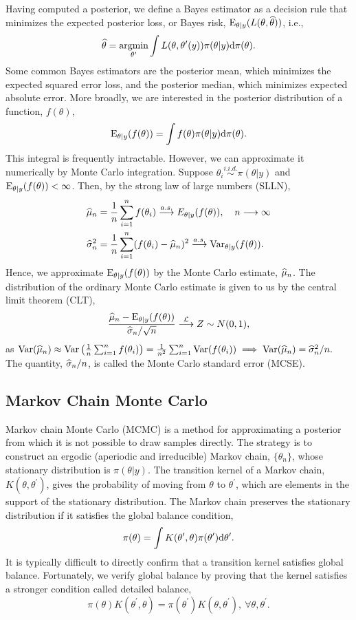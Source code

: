 Having computed a posterior, we define a Bayes estimator as a decision rule that minimizes the expected posterior loss, or Bayes risk, $ \mathrm{E}_{\theta|y}(L(\theta,\widehat{\theta})) $, i.e., $$ \widehat{\theta} = \underset{\theta^\prime}{\mathrm{argmin}}\int L(\theta,\theta^\prime(y)) \pi(\theta|y)\mathrm{d}\pi(\theta) .$$ Some common Bayes estimators are the posterior mean, which minimizes the expected squared error loss, and the posterior median, which minimizes expected absolute error. More broadly, we are interested in the posterior distribution of a function, $ f(\theta) $,  $$\mathrm{E}_{\theta|y}(f(\theta)) = \int f(\theta)\pi(\theta|y)\mathrm{d}\pi(\theta).$$
This integral is frequently intractable. However, we can approximate it numerically by Monte Carlo integration. Suppose $ \theta_i\overset{i.i.d.}{\sim}\pi(\theta|y) $ and $ \mathrm{E}_{\theta|y}(f(\theta))<\infty $. Then, by the strong law of large numbers (SLLN), 
\begin{align*}
\widehat{\mu}_n &= \frac{1}{n}\sum_{i=1}^n f(\theta_i) \overset{a.s.}{\longrightarrow} E_{\theta|y}(f(\theta)),\ \hspace{0.1in} n\longrightarrow\infty\\
\widehat{\sigma}^2_n &= \frac{1}{n}\sum_{i=1}^n (f(\theta_i) - \widehat{\mu}_n)^2 \overset{a.s.}{\longrightarrow}\mathrm{Var}_{\theta|y}(f(\theta)).
\end{align*}
Hence, we approximate $ \mathrm{E}_{\theta|y}(f(\theta)) $ by the Monte Carlo estimate, $ \widehat{\mu}_n $. The distribution of the ordinary Monte Carlo estimate is given to us by the central limit theorem (CLT), 
$$\frac{\widehat{\mu}_n - \mathrm{E}_{\theta|y}(f(\theta))}{\widehat{\sigma}_n/\sqrt{n}}\overset{\mathcal{L}}{\longrightarrow}Z\sim N(0,1),$$
as $ \mathrm{Var}(\widehat{\mu}_n) \approx \mathrm{Var}\left (\frac{1}{n}\sum_{i=1}^n f(\theta_i)\right ) = \frac{1}{n^2}\sum_{i=1}^n\mathrm{Var}(f(\theta_i)) \implies\mathrm{Var}(\widehat{\mu}_n) =\widehat{\sigma}_n^2 / n. $ The quantity, $ \widehat{\sigma}_n/n $, is called the Monte Carlo standard error (MCSE).  

\subsection{Markov Chain Monte Carlo}
\label{subsec:mcmc}

Markov chain Monte Carlo (MCMC) is a method for approximating a posterior from which it is not possible to draw samples directly. The strategy is to construct an ergodic (aperiodic and irreducible) Markov chain, $ \lbrace \theta_n\rbrace $, whose stationary distribution is $ \pi(\theta|y) $. The transition kernel of a Markov chain, $ K(\theta,\theta^\prime) $, gives the probability of moving from $ \theta $ to $ \theta^\prime $, which are elements in the support of the stationary distribution. The Markov chain preserves the stationary distribution if it satisfies the global balance condition,
$$\pi(\theta) = \int K(\theta^\prime,\theta)\pi(\theta^\prime)\mathrm{d} \theta^\prime.$$
It is typically difficult to directly confirm that a transition kernel satisfies global balance. Fortunately, we verify global balance by proving that the kernel satisfies a stronger condition called detailed balance,
$$\pi(\theta)K(\theta^\prime,\theta) = \pi(\theta^\prime)K(\theta,\theta^\prime),\ \forall \theta,\theta^\prime.$$

